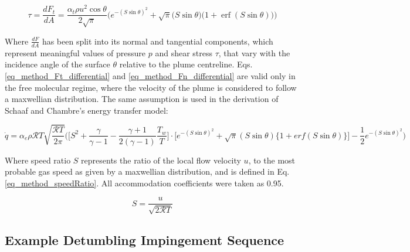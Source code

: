 \documentclass[journal]{new-aiaa}
\begin{document}
\begin{equation}
        \tau = \frac{dF_t}{dA} = \frac{\alpha_t \rho u^2 \cos{\theta}}{2 \sqrt{\pi}} \Bigg( e^{-(S\sin{\theta})^2}  + \sqrt{\pi} \Big(S \sin{\theta}\Big) \Big(1 + \operatorname{erf} (S \sin{\theta})\Big)    \Bigg)
    \label{eq_method_Ft_differential}
\end{equation}

Where $\frac{dF}{dA}$ has been split into its normal and tangential components, which represent meaningful values of pressure $p$ and shear stress $\tau$, that vary with the incidence angle of the surface $\theta$ relative to the plume centreline. Eqs. \ref{eq_method_Ft_differential} and \ref{eq_method_Fn_differential} are valid only in the free molecular regime, where the velocity of the plume is considered to follow a maxwellian distribution. The same assumption is used in the derivation of Schaaf and Chambre's energy transfer model:

\begin{equation}
    \dot{q} =  \alpha_e \rho \mathcal{R} T \sqrt{\frac{\mathcal{R} T}{2 \pi}} \bigg( \bigg[ S^2 + \frac{\gamma}{\gamma - 1} - \frac{\gamma + 1 }{2( \gamma -1)} \frac{T_w}{T} \bigg] 
     \cdot \bigg[ e^{-(S \sin{\theta})^2} + \sqrt{\pi} ( S \sin{\theta} ) \{1 + erf ( S \sin{\theta}) \}  \bigg]
     - \frac{1}{2} e^{-(S \sin{\theta})^2} \bigg) 
    \label{method_eq_heatFluxIntegral}
\end{equation}

Where speed ratio $S$ represents the ratio of the local flow velocity $u$, to the most probable gas speed as given by a maxwellian distribution, and is defined in Eq. \ref{eq_method_speedRatio}. All accommodation coefficients were taken as 0.95.

\begin{equation}
    S = \frac{u}{\sqrt{2 \mathcal{R} T}}
    \label{eq_method_speedRatio}
\end{equation}







\subsection{Example Detumbling Impingement Sequence}

\end{document}
